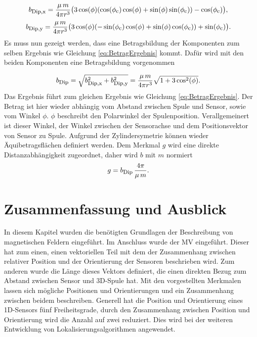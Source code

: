 \begin{equation}
    b_{\textrm{\footnotesize{Dip,x}}} = \frac{\mu\,m}{4 \pi r^3} \bigl(3 \cos(\phi) (\cos(\phi_{\textrm{\footnotesize{c}}})\cos(\phi) + \sin(\phi) \sin(\phi_{\textrm{\footnotesize{c}}})) -\cos(\phi_{\textrm{\footnotesize{c}}})\bigr),
    \label{eq:B_XX}
\end{equation}
\begin{equation}
    b_{\textrm{\footnotesize{Dip,y}}} = \frac{\mu\,m}{4 \pi r^3} \bigl(3 \cos(\phi) (-\sin(\phi_{\textrm{\footnotesize{c}}})\cos(\phi) + \sin(\phi) \cos(\phi_{\textrm{\footnotesize{c}}})) +\sin(\phi_{\textrm{\footnotesize{c}}})\bigr).
    \label{eq:B_YX}
\end{equation}
Es muss nun gezeigt werden, dass eine Betragsbildung der Komponenten zum selben Ergebnis wie Gleichung \ref{eq:BetragErgebnis} kommt. Dafür wird mit den beiden Komponenten eine Betragsbildung vorgenommen

\begin{equation}
    b_{\textrm{\footnotesize{Dip}}} = \sqrt{b_{\textrm{\footnotesize{Dip,x}}}^2 + b_{\textrm{\footnotesize{Dip,y}}}^2} =\frac{\mu\,m}{4 \pi r^3} \sqrt{1+3 \cos^2(\phi)}.
    \label{eq:BBetrag1DSen}
\end{equation}
Das Ergebnis führt zum gleichen Ergebnis wie Gleichung \ref{eq:BetragErgebnis}. Der Betrag ist hier wieder abhängig vom Abstand zwischen Spule und Sensor, sowie vom Winkel $\phi$. $\phi$ beschreibt den Polarwinkel der Spulenposition. Verallgemeinert ist dieser Winkel, der Winkel zwischen der Sensorachse und dem Positionsvektor von Sensor zu Spule. Aufgrund der Zylindersymetrie können wieder Äquibetragsflächen definiert werden. Dem Merkmal $g$ wird eine direkte Distanzabhängigkeit zugeordnet, daher wird $b$ mit $m$ normiert
\begin{equation}
    g = b_{\textrm{\footnotesize{Dip}}} \, \frac{4 \pi}{\mu\,m}.
    \label{eq:defG}
\end{equation}

\section{Zusammenfassung und Ausblick}
\label{sec:Summary_Kap3}
In diesem Kapitel wurden die benötigten Grundlagen der Beschreibung von magnetischen Feldern eingeführt. Im Anschluss wurde der MV eingeführt. Dieser hat zum einen, einen vektoriellen Teil mit dem der Zusammenhang zwischen relativer Position und der Orientierung der Sensoren beschrieben wird. Zum anderen wurde die Länge dieses Vektors definiert, die einen direkten Bezug zum Abstand zwischen Sensor und 3D-Spule hat. Mit den vorgestellten Merkmalen lassen sich mögliche Positionen und Orientierungen und ein Zusammenhang zwischen beidem beschreiben. Generell hat die Position und Orientierung eines 1D-Sensors fünf Freiheitsgrade, durch den Zusammenhang zwischen Position und Orientierung wird die Anzahl auf zwei reduziert. Dies wird bei der weiteren Entwicklung von Lokalisierungsalgorithmen angewendet.
 
